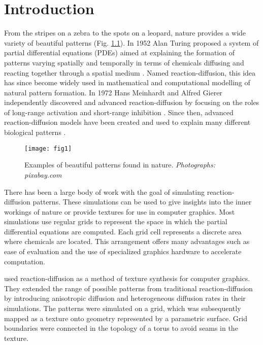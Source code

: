 \chapter{Introduction}
From the stripes on a zebra to the spots on a leopard, nature provides a wide variety of beautiful patterns (Fig. \ref{fig:naturalPatterns1}). In 1952 Alan Turing proposed a system of partial differential equations (PDEs) aimed at explaining the formation of patterns varying spatially and temporally in terms of chemicals diffusing and reacting together through a spatial medium \citep{turing1952}. Named reaction-diffusion, this idea has since become widely used in mathematical and computational modelling of natural pattern formation. In 1972 Hans Meinhardt and Alfred Gierer independently discovered and advanced reaction-diffusion by focusing on the roles of long-range activation and short-range inhibition \citep{gierer1972}. Since then, advanced reaction-diffusion models have been created and used to explain many different biological patterns \citep{garzon2011, fowler1992, lefevre2010, meinhardt2009}.

\begin{figure}[H]
  \centering
  \texttt{[image: fig1]}
  \caption{Examples of beautiful patterns found in nature. \textit{Photographs: pixabay.com}}
  \label{fig:naturalPatterns1}
\end{figure}

There has been a large body of work with the goal of simulating reaction-diffusion patterns. These simulations can be used to give insights into the inner workings of nature or provide textures for use in computer graphics. Most simulations use regular grids to represent the space in which the partial differential equations are computed. Each grid cell represents a discrete area where chemicals are located. This arrangement offers many advantages such as ease of evaluation and the use of specialized graphics hardware to accelerate computation.

\citet{witkin1991} used reaction-diffusion as a method of texture synthesis for computer graphics. They extended the range of possible patterns from traditional reaction-diffusion by introducing anisotropic diffusion and heterogeneous diffusion rates in their simulations. The patterns were simulated on a grid, which was subsequently mapped as a texture onto geometry represented by a parametric surface. Grid boundaries were connected in the topology of a torus to avoid seams in the texture.


